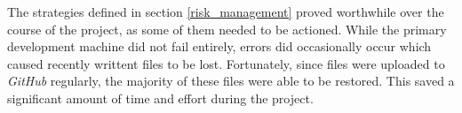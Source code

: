 
The strategies defined in section \ref{risk_management} proved worthwhile over the course of the project, as some of them needed to be actioned. While the primary development machine did not fail entirely, errors did occasionally occur which caused recently writtent files to be lost. Fortunately, since files were uploaded to \textit{GitHub} regularly, the majority of these files were able to be restored. This saved a significant amount of time and effort during the project. 
